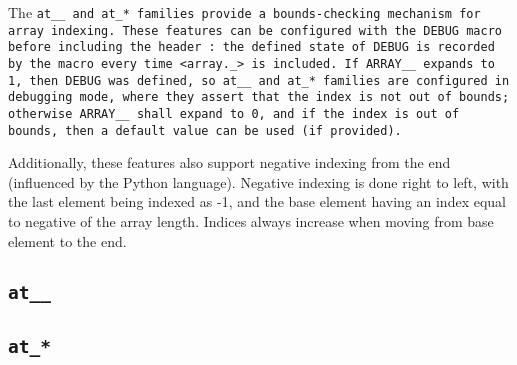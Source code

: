 The \tt{at__} and \tt{at_}* families provide a
bounds-checking mechanism for array indexing.
These features can be configured with the \tt{DEBUG} macro before
including the header : the \tt{defined} state of \tt{DEBUG}
is recorded by the macro  every time \tt{<array._>} is included.
If \tt{ARRAY__} expands to \tt{1}, then \tt{DEBUG} was defined, so \tt{at__} and
\tt{at_}* families are configured in debugging mode, where they assert that the
index is not out of bounds; otherwise \tt{ARRAY__} shall expand to \tt{0}, and
if the index is out of bounds, then a default value can be used (if provided).

Additionally, these features also support negative indexing from the end
(influenced by the Python language).
Negative indexing is done right to left, with the last element being indexed as
-1, and the base element having an index equal to negative of the array length.
Indices always increase when moving from base element to the end.

\subsection{\tt{at__}}


\subsection{\tt{at_}*}


